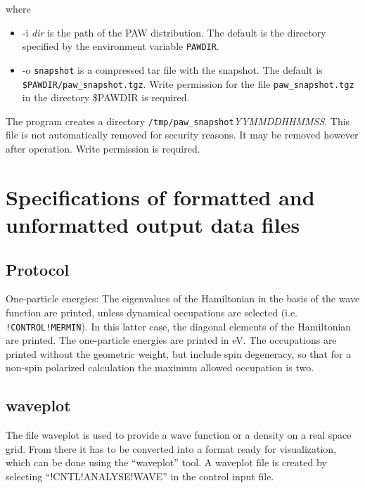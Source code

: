 \documentclass[final,12pt,makeidx,DIV=calc]{article}
\begin{document}
{{{{{{\bigskip{}
\bigskip

where 
\begin{itemize}
\item -i \textit{dir} is the path of the PAW distribution. The default
  is the directory specified by the environment variable
  \texttt{PAWDIR}.
\item -o \texttt{snapshot} is a compressed tar file with the
  snapshot. The default is \texttt{\$PAWDIR/paw\_snapshot.tgz}.  Write
  permission for the file \texttt{paw\_snapshot.tgz} in the directory
  \$PAWDIR is required.  
\end{itemize}
The program creates a directory
\texttt{/tmp/paw\_snapshot}\textit{YYMMDDHHMMSS}. This file is not
automatically removed for security reasons. It may be removed however
after operation. Write permission is required.


\newpage
\section{Specifications of formatted and unformatted output data files}
\subsection{Protocol}
One-particle energies: The eigenvalues of the Hamiltonian in the basis
of the wave function are printed, unless dynamical occupations are
selected (i.e. \texttt{!CONTROL!MERMIN}). In this latter case, the
diagonal elements of the Hamiltonian are printed. The one-particle
energies are printed in eV. The occupations are printed without the
geometric weight, but include spin degeneracy, so that for a non-spin
polarized calculation the maximum allowed occupation is two.



\subsection{waveplot}
The file waveplot is used to provide a wave function or a density on
a real space grid. From there it has to be converted into a format
ready for visualization, which can be done using the ``waveplot'' tool.
A waveplot file is created by selecting ``!CNTL!ANALYSE!WAVE'' in the
control input file.


}}}}}}
\end{document}
